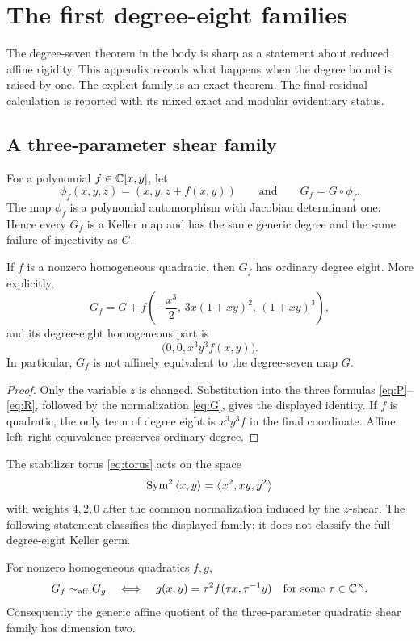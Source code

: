 \section{The first degree-eight families}
\label{app:degree-eight}

The degree-seven theorem in the body is sharp as a statement about reduced
affine rigidity.  This appendix records what happens when the degree bound is
raised by one.  The explicit family is an exact theorem.  The final residual
calculation is reported with its mixed exact and modular evidentiary status.

\subsection{A three-parameter shear family}

For a polynomial \(f\in\mathbb C[x,y]\), let
\[
\phi_f(x,y,z)=(x,y,z+f(x,y))
\qquad\text{and}\qquad
G_f=G\circ\phi_f.
\]
The map \(\phi_f\) is a polynomial automorphism with Jacobian determinant
one.  Hence every \(G_f\) is a Keller map and has the same generic degree and
the same failure of injectivity as \(G\).

\begin{proposition}
\label{prop:quadratic-shears}
If \(f\) is a nonzero homogeneous quadratic, then \(G_f\) has ordinary degree
eight.  More explicitly,
\[
G_f
=G+f\left(-\frac{x^3}{2},\,
          3x(1+xy)^2,\,
          (1+xy)^3\right),
\]
and its degree-eight homogeneous part is
\[
\bigl(0,0,x^3y^3f(x,y)\bigr).
\]
In particular, \(G_f\) is not affinely equivalent to the degree-seven map
\(G\).
\end{proposition}

\begin{proof}
Only the variable \(z\) is changed.  Substitution into the three formulas
\eqref{eq:P}--\eqref{eq:R}, followed by the normalization
\eqref{eq:G}, gives the displayed identity.  If \(f\) is quadratic, the only
term of degree eight is \(x^3y^3f\) in the final coordinate.  Affine
left--right equivalence preserves ordinary degree.
\end{proof}

The stabilizer torus \eqref{eq:torus} acts on the space
\[
\operatorname{Sym}^2\left\langle x,y\right\rangle
=\left\langle x^2,xy,y^2\right\rangle
\]
with weights \(4,2,0\) after the common normalization induced by the
\(z\)-shear.  The following statement classifies the displayed family; it
does not classify the full degree-eight Keller germ.

\begin{theorem}
\label{thm:shear-classification}
For nonzero homogeneous quadratics \(f,g\),
\[
G_f\sim_{\mathrm{aff}}G_g
\quad\Longleftrightarrow\quad
g(x,y)=\tau^2f(\tau x,\tau^{-1}y)
\quad\text{for some }\tau\in\mathbb C^\times .
\]
Consequently the generic affine quotient of the three-parameter quadratic
shear family has dimension two.
\end{theorem}

